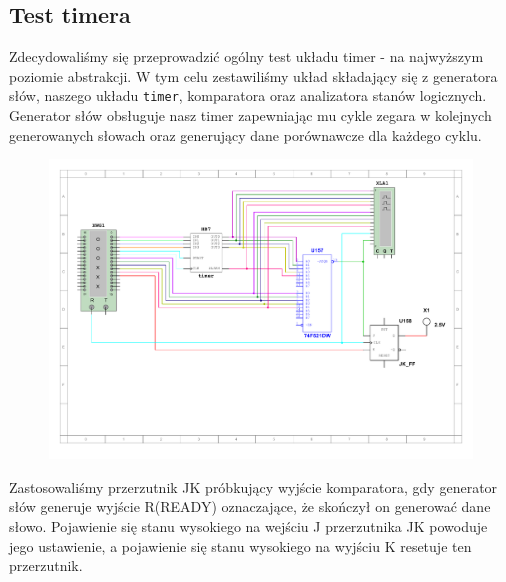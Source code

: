 \documentclass[a4paper]{article}
\begin{document}
\pagebreak
\subsection{Test timera}
Zdecydowaliśmy się przeprowadzić ogólny test układu timer - na najwyższym poziomie abstrakcji.
W tym celu zestawiliśmy układ składający się z generatora słów, naszego układu \verb|timer|, komparatora oraz analizatora
stanów logicznych. Generator słów obsługuje nasz timer zapewniając mu cykle zegara w kolejnych 
generowanych słowach oraz generujący dane porównawcze dla każdego cyklu.

\begin{figure}[H]
    \centering
    \includegraphics[width=\textwidth]{general_test.pdf}
\end{figure}

Zastosowaliśmy przerzutnik JK próbkujący wyjście komparatora, gdy generator słów generuje wyjście R(READY)
oznaczające, że skończył on generować dane słowo. Pojawienie się stanu wysokiego na wejściu J przerzutnika JK
powoduje jego ustawienie, a pojawienie się stanu wysokiego na wyjściu K resetuje ten przerzutnik.
\end{document}
